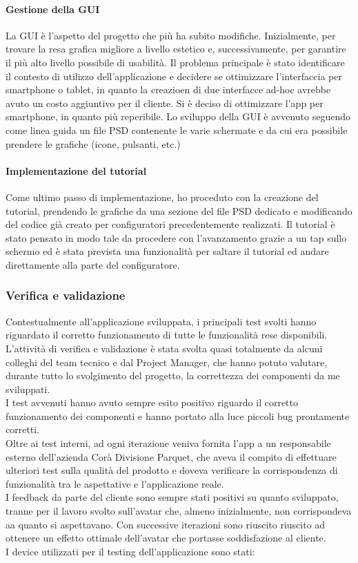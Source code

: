 \paragraph{Gestione della GUI}
La GUI \`e l'aspetto del progetto che pi\`u ha subito modifiche. Inizialmente, per trovare la resa grafica migliore a livello estetico e, successivamente, per garantire il pi\`u alto livello possibile di usabilit\`a. Il problema principale \`e stato identificare il contesto di utilizzo dell'applicazione e decidere se ottimizzare l'interfaccia per smartphone o tablet, in quanto la creazioen di due interfacce ad-hoc avrebbe avuto un costo aggiuntivo per il cliente. Si \`e deciso di ottimizzare l'app per smartphone, in quanto pi\`u reperibile. Lo sviluppo della GUI \`e avvenuto seguendo come linea guida un file PSD contenente le varie schermate e da cui era possibile prendere le grafiche (icone, pulsanti, etc.)

\paragraph{Implementazione del tutorial}
Come ultimo passo di implementazione, ho proceduto con la creazione del tutorial, prendendo le grafiche da una sezione del file PSD dedicato e modificando del codice gi\`a creato per configuratori precedentemente realizzati. Il tutorial \`e stato pensato in modo tale da procedere con l'avanzamento grazie a un tap sullo schermo ed \`e stata prevista una funzionalit\`a per saltare il tutorial ed andare direttamente alla parte del configuratore.

\subsubsection{Verifica e validazione}
Contestualmente all'applicazione sviluppata, i principali test svolti hanno riguardato il corretto funzionamento di tutte le funzionalit\`a rese disponibili. L'attivit\`a di verifica e validazione \`e stata svolta quasi totalmente da alcuni colleghi del team tecnico e dal Project Manager, che hanno potuto valutare, durante tutto lo svolgimento del progetto, la correttezza dei componenti da me sviluppati.\\
I test avvenuti hanno avuto sempre esito positivo riguardo il corretto funzionamento dei componenti e hanno portato alla luce piccoli bug prontamente corretti.\\
Oltre ai test interni, ad ogni iterazione veniva fornita l'app a un responsabile esterno dell'azienda Cor\`a Divisione Parquet, che aveva il compito di effettuare ulteriori test sulla qualit\`a del prodotto e doveva verificare la corrispondenza di funzionalit\`a tra le aspettative e l'applicazione reale.\\
I feedback da parte del cliente sono sempre stati positivi su quanto sviluppato, tranne per il lavoro svolto sull'avatar che, almeno inizialmente, non corrispondeva aa quanto si aspettavano. Con successive iterazioni sono riuscito riuscito ad ottenere un effetto ottimale dell'avatar che portasse soddisfazione al cliente.\\
I device utilizzati per il testing dell'applicazione sono stati:

